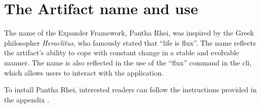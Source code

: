 \section{The Artifact name and use} \label{sec_artifact_name}

The name of the Expander Framework, Pantha Rhei, was inspired by the Greek philosopher
\emph{Heraclitus}, who famously stated that \enquote{life is flux}. The name reflects the
artifact's ability to cope with constant change in a stable and evolvable manner. The name
is also reflected in the use of the \enquote{flux} command in the \gls{cli}, which allows
users to interact with the application.

To install Pantha Rhei, interested readers can follow the instructions provided in the
appendix .




